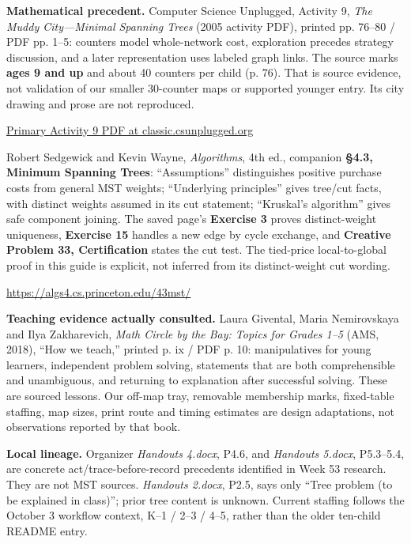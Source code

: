 \documentclass[11pt,letterpaper]{article}
\newcommand\topic[1]{\par\vspace{5pt}{\large\bfseries #1}\par}
\begin{document}
\topic{Source evidence, authorship and use limits}
\textbf{Mathematical precedent.} Computer Science Unplugged, Activity 9, \emph{The Muddy City---Minimal Spanning Trees} (2005 activity PDF), printed pp. 76--80 / PDF pp. 1--5: counters model whole-network cost, exploration precedes strategy discussion, and a later representation uses labeled graph links. The source marks \textbf{ages 9 and up} and about 40 counters per child (p. 76). That is source evidence, not validation of our smaller 30-counter maps or supported younger entry. Its city drawing and prose are not reproduced.\par
\href{https://classic.csunplugged.org/documents/activities/minimal-spanning-trees/unplugged-09-minimal_spanning_trees.pdf}{Primary Activity 9 PDF at classic.csunplugged.org}

Robert Sedgewick and Kevin Wayne, \emph{Algorithms}, 4th ed., companion \textbf{\S4.3, Minimum Spanning Trees}: ``Assumptions'' distinguishes positive purchase costs from general MST weights; ``Underlying principles'' gives tree/cut facts, with distinct weights assumed in its cut statement; ``Kruskal's algorithm'' gives safe component joining. The saved page's \textbf{Exercise 3} proves distinct-weight uniqueness, \textbf{Exercise 15} handles a new edge by cycle exchange, and \textbf{Creative Problem 33, Certification} states the cut test. The tied-price local-to-global proof in this guide is explicit, not inferred from its distinct-weight cut wording.\par
\url{https://algs4.cs.princeton.edu/43mst/}

\textbf{Teaching evidence actually consulted.} Laura Givental, Maria Nemirovskaya and Ilya Zakharevich, \emph{Math Circle by the Bay: Topics for Grades 1--5} (AMS, 2018), ``How we teach,'' printed p. ix / PDF p. 10: manipulatives for young learners, independent problem solving, statements that are both comprehensible and unambiguous, and returning to explanation after successful solving. These are sourced lessons. Our off-map tray, removable membership marks, fixed-table staffing, map sizes, print route and timing estimates are design adaptations, not observations reported by that book.

\textbf{Local lineage.} Organizer \emph{Handouts 4.docx}, P4.6, and \emph{Handouts 5.docx}, P5.3--5.4, are concrete act/trace-before-record precedents identified in Week 53 research. They are not MST sources. \emph{Handouts 2.docx}, P2.5, says only ``Tree problem (to be explained in class)''; prior tree content is unknown. Current staffing follows the October 3 workflow context, K--1 / 2--3 / 4--5, rather than the older ten-child README entry.
\end{document}
